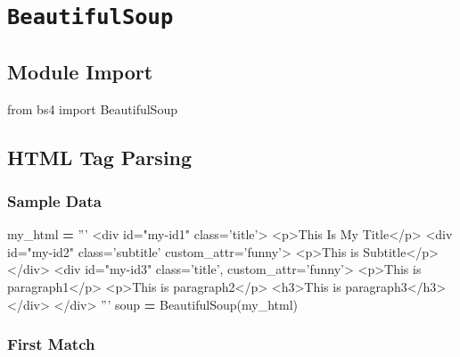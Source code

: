 \documentclass[
]{book}
\newenvironment{Shaded}{\begin{snugshade}}{\end{snugshade}}
\newcommand{\ImportTok}[1]{#1}
\newcommand{\NormalTok}[1]{#1}
\newcommand{\OperatorTok}[1]{\textcolor[rgb]{0.43,0.43,0.43}{\textbf{#1}}}
\newcommand{\StringTok}[1]{\textcolor[rgb]{0.5,0.5,0.5}{#1}}
\begin{document}
\hypertarget{beautifulsoup}{%
\section{\texorpdfstring{\texttt{BeautifulSoup}}{BeautifulSoup}}\label{beautifulsoup}}

\hypertarget{module-import-2}{%
\subsection{Module Import}\label{module-import-2}}

\begin{Shaded}
\begin{Highlighting}[]
\ImportTok{from}\NormalTok{ bs4 }\ImportTok{import}\NormalTok{ BeautifulSoup}
\end{Highlighting}
\end{Shaded}

\hypertarget{html-tag-parsing}{%
\subsection{HTML Tag Parsing}\label{html-tag-parsing}}

\hypertarget{sample-data-26}{%
\subsubsection{Sample Data}\label{sample-data-26}}

\begin{Shaded}
\begin{Highlighting}[]
\NormalTok{my_html }\OperatorTok{=} \StringTok{'''}
\StringTok{<div id="my-id1" class='title'> }
\StringTok{    <p>This Is My Title</p>}
\StringTok{    }
\StringTok{    <div id="my-id2" class='subtitle' custom_attr='funny'>}
\StringTok{        <p>This is Subtitle</p>}
\StringTok{    </div>}
\StringTok{    }
\StringTok{    <div id="my-id3" class='title',   custom_attr='funny'>}
\StringTok{        <p>This is paragraph1</p>}
\StringTok{        <p>This is paragraph2</p>}
\StringTok{        <h3>This is paragraph3</h3>}
\StringTok{    </div>}
\StringTok{</div>}
\StringTok{'''}
\NormalTok{soup }\OperatorTok{=}\NormalTok{ BeautifulSoup(my_html)}
\end{Highlighting}
\end{Shaded}

\hypertarget{first-match}{%
\subsubsection{First Match}\label{first-match}}
\end{document}
